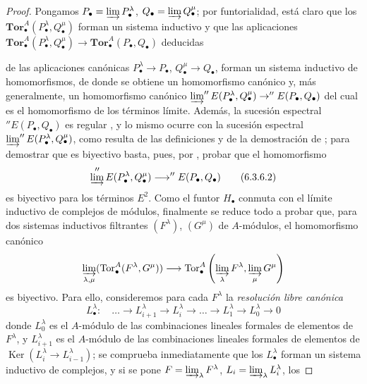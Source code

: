 \begin{proof}
Pongamos $P_\bullet=\varinjlim P_\bullet^\lambda$,
$Q_\bullet=\varinjlim Q_\bullet^\mu$; por funtorialidad, está claro que
los $\mathbf{Tor}_\bullet^A(P_\bullet^\lambda,Q_\bullet^\mu)$ forman un
sistema inductivo y que las aplicaciones
$\mathbf{Tor}_\bullet^A(P_\bullet^\lambda,Q_\bullet^\mu)\to
\mathbf{Tor}_\bullet^A(P_\bullet,Q_\bullet)$ deducidas


de las aplicaciones canónicas $P_\bullet^\lambda\to P_\bullet$,
$Q_\bullet^\mu\to Q_\bullet$, forman un sistema inductivo de homomorfismos,
de donde se obtiene un homomorfismo canónico  y, más
generalmente,
un homomorfismo canónico
$\varinjlim''E(P_\bullet^\lambda,Q_\bullet^\mu)\to''E(P_\bullet,Q_\bullet)$
del cual  es el homomorfismo de los términos límite.
Además, la sucesión espectral $''E(P_\bullet,Q_\bullet)$ es regular
, y lo mismo
ocurre con la sucesión espectral
$\varinjlim''E(P_\bullet^\lambda,Q_\bullet^\mu)$, como resulta
de las definiciones  y de la demostración de
; para demostrar que  es biyectivo basta,
pues, por , probar que el
homomorfismo
\[
  \varinjlim''E(P_\bullet^\lambda,Q_\bullet^\mu)
  \longrightarrow ''E(P_\bullet,Q_\bullet)
  \tag{6.3.6.2}\label{III.6.3.6.2.fr}
\]
es biyectivo para los términos $E^2$. Como el funtor $H_\bullet$ conmuta con
el límite inductivo de complejos de módulos, finalmente se reduce todo a
probar que, para dos sistemas inductivos filtrantes $(F^\lambda)$,
$(G^\mu)$ de $A$-módulos, el homomorfismo canónico
\[
  \varinjlim_{\lambda,\mu}(\operatorname{Tor}_\bullet^A(F^\lambda,G^\mu))
  \longrightarrow
  \operatorname{Tor}_\bullet^A
  \left(\varinjlim_\lambda F^\lambda,
        \varinjlim_\mu G^\mu\right)
\]
es biyectivo. Para ello, consideremos para cada $F^\lambda$ la \emph{resolución
libre canónica}
\[
  L_\bullet^\lambda:\quad
  \ldots\longrightarrow L_{i+1}^\lambda
  \longrightarrow L_i^\lambda\longrightarrow\ldots
  \longrightarrow L_1^\lambda\longrightarrow L_0^\lambda\longrightarrow0
\]
donde $L_0^\lambda$ es el $A$-módulo de las combinaciones lineales formales
de elementos de $F^\lambda$, y $L_{i+1}^\lambda$ es el $A$-módulo de las
combinaciones lineales formales de elementos de
$\operatorname{Ker}(L_i^\lambda\to L_{i-1}^\lambda)$; se comprueba
inmediatamente que los $L_\bullet^\lambda$ forman un sistema inductivo de
complejos, y si se pone
$F=\varinjlim_\lambda F^\lambda$, $L_i=\varinjlim_\lambda L_i^\lambda$, los

\end{proof}
